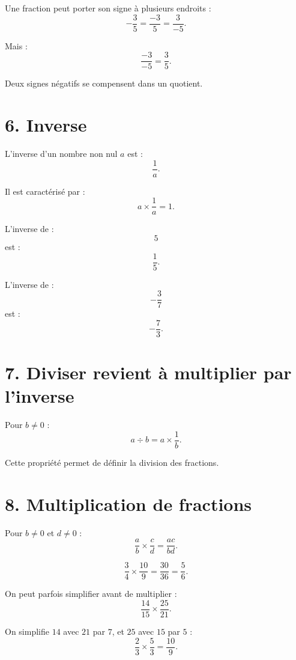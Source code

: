 Une fraction peut porter son signe à plusieurs endroits :
\[
-\dfrac35
=
\dfrac{-3}{5}
=
\dfrac3{-5}.
\]

Mais :
\[
\dfrac{-3}{-5}
=
\dfrac35.
\]

Deux signes négatifs se compensent dans un quotient.

\section{6. Inverse}

\begin{definition}
L'inverse d'un nombre non nul $a$ est :
\[
\dfrac1a.
\]

Il est caractérisé par :
\[
a\times\dfrac1a=1.
\]
\end{definition}

L'inverse de :
\[
5
\]
est :
\[
\dfrac15.
\]

L'inverse de :
\[
-\dfrac37
\]
est :
\[
-\dfrac73.
\]

\section{7. Diviser revient à multiplier par l'inverse}

Pour $b\neq0$ :
\[
a\div b=a\times\dfrac1b.
\]

Cette propriété permet de définir la division des fractions.


\section{8. Multiplication de fractions}

Pour $b\neq0$ et $d\neq0$ :
\[
\boxed{
\dfrac ab\times\dfrac cd=\dfrac{ac}{bd}
}.
\]

\begin{exemple}
\[
\dfrac34\times\dfrac{10}{9}
=
\dfrac{30}{36}
=
\dfrac56.
\]
\end{exemple}

On peut parfois simplifier avant de multiplier :
\[
\dfrac{14}{15}\times\dfrac{25}{21}.
\]

On simplifie $14$ avec $21$ par $7$, et $25$ avec $15$ par $5$ :
\[
\dfrac23\times\dfrac53=\dfrac{10}{9}.
\]

